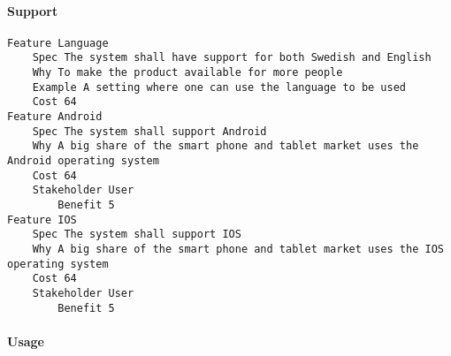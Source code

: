 				
			 \paragraph{Support}


\begin{lstlisting}
Feature Language
	Spec The system shall have support for both Swedish and English
	Why To make the product available for more people
	Example A setting where one can use the language to be used
	Cost 64
Feature Android
	Spec The system shall support Android
	Why A big share of the smart phone and tablet market uses the Android operating system
	Cost 64
	Stakeholder User
		Benefit 5
Feature IOS
	Spec The system shall support IOS
	Why A big share of the smart phone and tablet market uses the IOS operating system
	Cost 64
	Stakeholder User
		Benefit 5

\end{lstlisting}
		
				
			 \paragraph{Usage}


